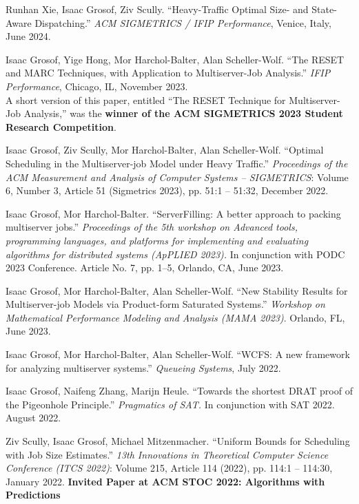 \documentclass{res}
\begin{document}
\begin{resume}
    Runhan Xie, Isaac Grosof, Ziv Scully.
    ``Heavy-Traffic Optimal Size- and State-Aware Dispatching.''
    \textit{ACM SIGMETRICS / IFIP Performance}, Venice, Italy, June 2024.


    Isaac Grosof, Yige Hong, Mor Harchol-Balter, Alan Scheller-Wolf.
    ``The RESET and MARC Techniques, with Application to Multiserver-Job Analysis.''
    \textit{IFIP Performance}, Chicago, IL, November 2023. \\
    A short version of this paper, entitled ``The RESET Technique for Multiserver-Job Analysis,''
    was the \textbf{winner of the ACM SIGMETRICS 2023 Student Research Competition}.

    Isaac Grosof, Ziv Scully, Mor Harchol-Balter, Alan Scheller-Wolf.
    ``Optimal Scheduling in the Multiserver-job Model under Heavy Traffic.''
     \textit{Proceedings of the ACM Measurement and Analysis of Computer Systems -- SIGMETRICS}:
     Volume 6, Number 3, Article 51 (Sigmetrics 2023),
     pp. 51:1 -- 51:32, December 2022.

    Isaac Grosof, Mor Harchol-Balter. ``ServerFilling: A better approach to packing multiserver jobs.''
    \textit{Proceedings of the 5th workshop on Advanced tools, programming languages, and platforms for implementing and evaluating algorithms for distributed systems (ApPLIED 2023).}
    In conjunction with PODC 2023 Conference. Article No. 7, pp. 1--5, Orlando, CA, June 2023.

    Isaac Grosof, Mor Harchol-Balter, Alan Scheller-Wolf. ``New Stability Results for Multiserver-job Models via Product-form Saturated Systems.'' \textit{Workshop on Mathematical Performance Modeling and Analysis (MAMA 2023)}. Orlando, FL, June 2023.

    Isaac Grosof, Mor Harchol-Balter, Alan Scheller-Wolf.
    ``WCFS: A new framework for analyzing multiserver systems.''
    \textit{Queueing Systems}, July 2022.

    Isaac Grosof, Naifeng Zhang, Marijn Heule.
    ``Towards the shortest DRAT proof of the Pigeonhole Principle.''
    \textit{Pragmatics of SAT.} In conjunction with SAT 2022. August 2022.

    Ziv Scully, Isaac Grosof, Michael Mitzenmacher.
    ``Uniform Bounds for Scheduling with Job Size Estimates.'' 
    \textit{13th Innovations in Theoretical Computer Science Conference (ITCS 2022)}:
    Volume 215, Article 114 (2022), pp. 114:1 -- 114:30, January 2022.
    \textbf{Invited Paper at ACM STOC 2022: Algorithms with Predictions}


\end{resume}
\end{document}
